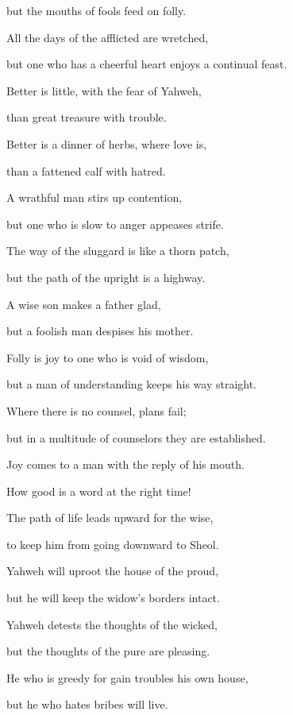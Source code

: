 {\par }{\QB but the mouths of fools feed on folly.
\par }{\Q {}All the days of the afflicted are wretched,
\par }{\QB but one who has a cheerful heart enjoys a continual feast.
\par }{\Q {}Better is little, with the fear of Yahweh,
\par }{\QB than great treasure with trouble.
\par }{\Q {}Better is a dinner of herbs, where love is,
\par }{\QB than a fattened calf with hatred.
\par }{\Q {}A wrathful man stirs up contention,
\par }{\QB but one who is slow to anger appeases strife.
\par }{\Q {}The way of the sluggard is like a thorn patch,
\par }{\QB but the path of the upright is a highway.
\par }{\Q {}A wise son makes a father glad,
\par }{\QB but a foolish man despises his mother.
\par }{\Q {}Folly is joy to one who is void of wisdom,
\par }{\QB but a man of understanding keeps his way straight.
\par }{\Q {}Where there is no counsel, plans fail;
\par }{\QB but in a multitude of counselors they are established.
\par }{\Q {}Joy comes to a man with the reply of his mouth.
\par }{\QB How good is a word at the right time!
\par }{\Q {}The path of life leads upward for the wise,
\par }{\QB to keep him from going downward to Sheol.
\par }{\Q {}Yahweh will uproot the house of the proud,
\par }{\QB but he will keep the widow’s borders intact.
\par }{\Q {}Yahweh detests the thoughts of the wicked,
\par }{\QB but the thoughts of the pure are pleasing.
\par }{\Q {}He who is greedy for gain troubles his own house,
\par }{\QB but he who hates bribes will live.
}
